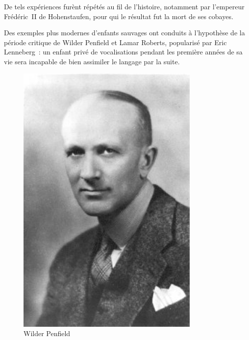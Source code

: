 \begin{minipage}[H]{0.65\linewidth}
De tels expériences furènt répétés au fil de l'histoire, notamment par l'empereur Frédéric~II de Hohenstaufen, pour qui le résultat fut la mort de ses \og{}cobayes\fg{}\cite{ggcoulton-francis-to-dante}. 

Des exemples plus modernes d'enfants \og{}sauvages\fg{} ont conduits à l'hypothèse de la \og{}période critique\fg{} de Wilder Penfield et Lamar Roberts\cite{penfield2003speech}, popularisé par Eric Lenneberg\cite{lenneberg-crit-period}~: un enfant privé de vocalisations pendant les première années de sa vie sera incapable de bien assimiler le langage par la suite.
\vspace{1cm}
\end{minipage}
\begin{minipage}[H]{0.34\linewidth}
  \begin{figure}[H]
  \centering
  \includegraphics[width=0.8\textwidth]{../resources/illustrations/penfield}
  \caption{Wilder Penfield}
  \end{figure}
\end{minipage}


